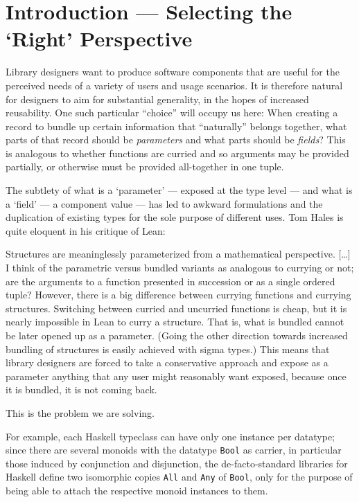 \documentclass[sigplan,screen]{acmart}
\begin{document}
\maketitle

\section{Introduction --- Selecting the ‘Right’ Perspective}
\label{sec:orgf6704e8}

Library designers want to produce software components that are useful for
the perceived needs of a variety of users and usage scenarios.  It is therefore
natural for designers to aim for substantial generality, in the hopes of increased
reusability. One such particular ``choice'' will occupy us here: When creating a
record to bundle up certain information that “naturally” belongs together, what
parts of that record should be \emph{parameters} and what parts should be
\emph{fields}? This is analogous to whether functions are curried and so arguments
may be provided partially, or otherwise must be provided all-together in one tuple.

The subtlety of what is a ‘parameter’ --- exposed at the type level --- and what is a
‘field’ --- a component value --- has led to awkward formulations and
the duplication of existing types for the sole purpose of different uses.
Tom Hales \cite{Hales-blog-post} is quite eloquent in his critique of Lean:
\begin{quoting}
 Structures are meaninglessly parameterized from a mathematical perspective.
 [\ldots{}] I think of the parametric versus bundled variants as analogous to currying
 or not; are the arguments to a function presented in succession or as a single
 ordered tuple? However, there is a big difference between currying functions
 and currying structures. Switching between curried and uncurried functions is
 cheap, but it is nearly impossible in Lean to curry a structure. That is, what
 is bundled cannot be later opened up as a parameter. (Going the other direction
 towards increased bundling of structures is easily achieved with sigma types.)
This means that library designers are forced to take a conservative approach and
expose as a parameter anything that any user might reasonably want exposed, because
once it is bundled, it is not coming back.
\end{quoting}
This is the problem we are solving.

For example, each Haskell typeclass can have only one instance per datatype;
since there are several monoids with the datatype \texttt{Bool} as carrier,
in particular those induced by conjunction and disjunction,
the de-facto-standard libraries for Haskell
define two isomorphic copies \texttt{All} and \texttt{Any} of \texttt{Bool},
only for the purpose of being able to attach the respective monoid instances to them.
\end{document}
